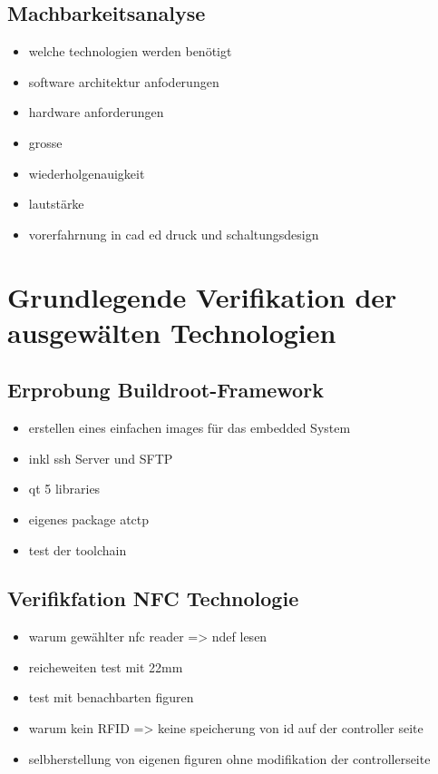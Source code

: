 \hypertarget{machbarkeitsanalyse}{%
\subsection{Machbarkeitsanalyse}\label{machbarkeitsanalyse}}

\begin{itemize}
\tightlist
\item
  welche technologien werden benötigt
\item
  software architektur anfoderungen
\item
  hardware anforderungen
\item
  grosse
\item
  wiederholgenauigkeit
\item
  lautstärke
\item
  vorerfahrnung in cad ed druck und schaltungsdesign
\end{itemize}

\hypertarget{grundlegende-verifikation-der-ausgewuxe4lten-technologien}{%
\section{Grundlegende Verifikation der ausgewälten
Technologien}\label{grundlegende-verifikation-der-ausgewuxe4lten-technologien}}

\hypertarget{erprobung-buildroot-framework}{%
\subsection{Erprobung
Buildroot-Framework}\label{erprobung-buildroot-framework}}

\begin{itemize}
\tightlist
\item
  erstellen eines einfachen images für das embedded System
\item
  inkl ssh Server und SFTP
\item
  qt 5 libraries
\item
  eigenes package atctp
\item
  test der toolchain
\end{itemize}

\hypertarget{verifikfation-nfc-technologie}{%
\subsection{Verifikfation NFC
Technologie}\label{verifikfation-nfc-technologie}}

\begin{itemize}
\tightlist
\item
  warum gewählter nfc reader =\textgreater{} ndef lesen
\item
  reicheweiten test mit 22mm
\item
  test mit benachbarten figuren
\item
  warum kein RFID =\textgreater{} keine speicherung von id auf der
  controller seite
\item
  selbherstellung von eigenen figuren ohne modifikation der
  controllerseite
\end{itemize}

